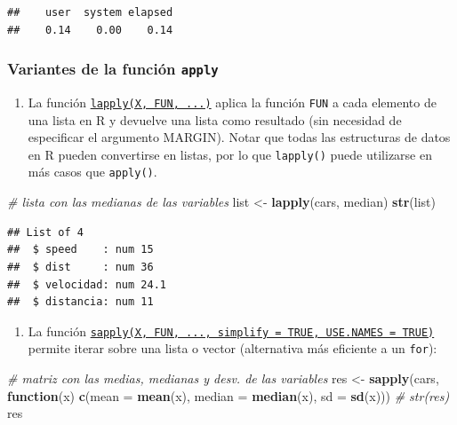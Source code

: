 \documentclass[
]{book}
\newenvironment{Shaded}{\begin{snugshade}}{\end{snugshade}}
\newcommand{\AttributeTok}[1]{\textcolor[rgb]{0.13,0.29,0.53}{#1}}
\newcommand{\CommentTok}[1]{\textcolor[rgb]{0.56,0.35,0.01}{\textit{#1}}}
\newcommand{\ControlFlowTok}[1]{\textcolor[rgb]{0.13,0.29,0.53}{\textbf{#1}}}
\newcommand{\FunctionTok}[1]{\textcolor[rgb]{0.13,0.29,0.53}{\textbf{#1}}}
\newcommand{\NormalTok}[1]{#1}
\newcommand{\OtherTok}[1]{\textcolor[rgb]{0.56,0.35,0.01}{#1}}
\providecommand{\tightlist}{%
  \setlength{\itemsep}{0pt}\setlength{\parskip}{0pt}}
\begin{document}
\begin{verbatim}
##    user  system elapsed 
##    0.14    0.00    0.14
\end{verbatim}

\hypertarget{variantes-de-la-funciuxf3n-apply}{%
\subsubsection{\texorpdfstring{Variantes de la función \texttt{apply}}{Variantes de la función apply}}\label{variantes-de-la-funciuxf3n-apply}}

\begin{enumerate}
\def\labelenumi{\alph{enumi}.}
\tightlist
\item
  La función \href{https://www.rdocumentation.org/packages/base/versions/3.6.1/topics/lapply}{\texttt{lapply(X,\ FUN,\ ...)}}
  aplica la función \texttt{FUN} a cada elemento de una lista en R y devuelve una lista como resultado (sin necesidad de especificar el argumento MARGIN). Notar que todas las estructuras de datos en R pueden convertirse en listas, por lo que \texttt{lapply()} puede utilizarse en más casos que \texttt{apply()}.
\end{enumerate}

\begin{Shaded}
\begin{Highlighting}[]
\CommentTok{\# lista con las medianas de las variables}
\NormalTok{list }\OtherTok{\textless{}{-}} \FunctionTok{lapply}\NormalTok{(cars, median)}
\FunctionTok{str}\NormalTok{(list)}
\end{Highlighting}
\end{Shaded}

\begin{verbatim}
## List of 4
##  $ speed    : num 15
##  $ dist     : num 36
##  $ velocidad: num 24.1
##  $ distancia: num 11
\end{verbatim}

\begin{enumerate}
\def\labelenumi{\alph{enumi}.}
\setcounter{enumi}{1}
\tightlist
\item
  La función
  \href{https://www.rdocumentation.org/packages/base/versions/3.6.1/topics/sapply}{\texttt{sapply(X,\ FUN,\ ...,\ simplify\ =\ TRUE,\ USE.NAMES\ =\ TRUE)}} permite iterar sobre una lista o vector (alternativa más eficiente a un \texttt{for}):
\end{enumerate}

\begin{Shaded}
\begin{Highlighting}[]
\CommentTok{\# matriz con las medias, medianas y desv. de las variables}
\NormalTok{res }\OtherTok{\textless{}{-}} \FunctionTok{sapply}\NormalTok{(cars, }
          \ControlFlowTok{function}\NormalTok{(x) }\FunctionTok{c}\NormalTok{(}\AttributeTok{mean =} \FunctionTok{mean}\NormalTok{(x), }
                        \AttributeTok{median =} \FunctionTok{median}\NormalTok{(x), }
                        \AttributeTok{sd =} \FunctionTok{sd}\NormalTok{(x)))}
\CommentTok{\# str(res)}
\NormalTok{res}
\end{Highlighting}
\end{Shaded}
\end{document}
